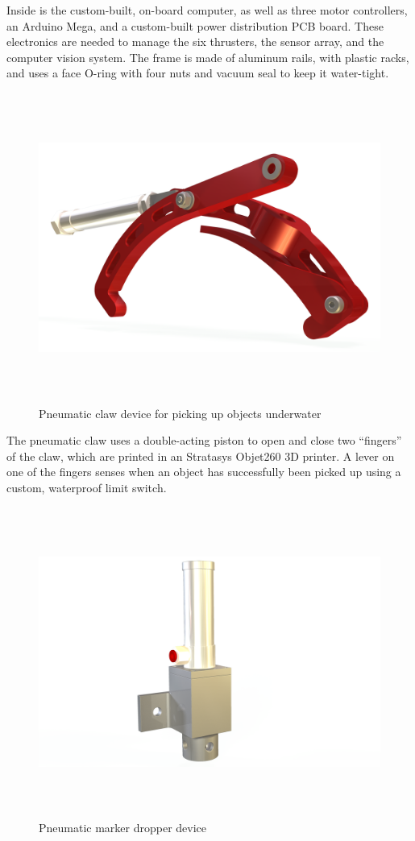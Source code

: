 \documentclass[12pt, landscape]{article}
\begin{document}
Inside is the custom-built, on-board computer, as well as three motor controllers, an Arduino Mega, and a custom-built power distribution PCB board.  These electronics are needed to manage the six thrusters, the sensor array, and the computer vision system.  The frame is made of aluminum rails, with plastic racks, and uses a face O-ring with four nuts and vacuum seal to keep it water-tight. 

\begin{figure}[H]
\centering
\includegraphics[height=4in]{media/GRABBER-RENDER-ALPHA.png}
\caption{Pneumatic claw device for picking up objects underwater}
\label{grabber}
\end{figure}

The pneumatic claw uses a double-acting piston to open and close two ``fingers'' of the claw, which are printed in an Stratasys Objet260 3D printer.  A lever on one of the fingers senses when an object has successfully been picked up using a custom, waterproof limit switch.  

\begin{figure}[H]
\centering
\includegraphics[height=4in]{media/MARKER-RENDER-ALPHA.png}
\caption{Pneumatic marker dropper device}
\label{marker}
\end{figure}
\end{document}
